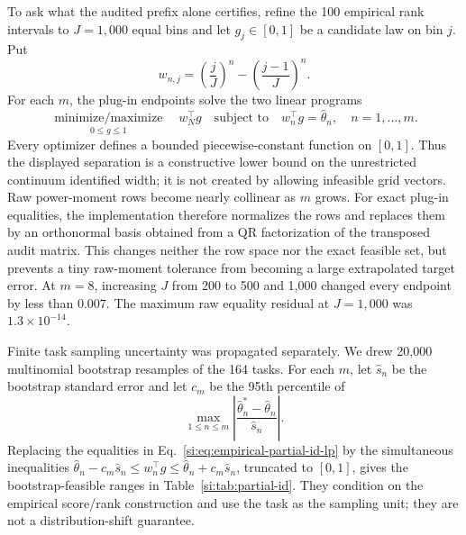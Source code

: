 To ask what the audited prefix alone certifies, refine the 100 empirical rank intervals to $J=1{,}000$ equal bins and let $g_j\in[0,1]$ be a candidate law on bin $j$. Put
\begin{equation}
w_{n,j}=\left(\frac jJ\right)^n-\left(\frac{j-1}J\right)^n.
\label{si:eq:bin-mass}
\end{equation}
For each $m$, the plug-in endpoints solve the two linear programs
\begin{equation}
\underset{0\le g\le1}{\operatorname{minimize/maximize}}\quad
w_N^\top g
\quad\text{subject to}\quad
w_n^\top g=\widehat\theta_n,\quad n=1,\ldots,m.
\label{si:eq:empirical-partial-id-lp}
\end{equation}
Every optimizer defines a bounded piecewise-constant function on $[0,1]$. Thus the displayed separation is a constructive lower bound on the unrestricted continuum identified width; it is not created by allowing infeasible grid vectors. Raw power-moment rows become nearly collinear as $m$ grows. For exact plug-in equalities, the implementation therefore normalizes the rows and replaces them by an orthonormal basis obtained from a QR factorization of the transposed audit matrix. This changes neither the row space nor the exact feasible set, but prevents a tiny raw-moment tolerance from becoming a large extrapolated target error. At $m=8$, increasing $J$ from 200 to 500 and 1,000 changed every endpoint by less than $0.007$. The maximum raw equality residual at $J=1{,}000$ was $1.3\times10^{-14}$.

Finite task sampling uncertainty was propagated separately. We drew 20,000 multinomial bootstrap resamples of the 164 tasks. For each $m$, let $\widehat s_n$ be the bootstrap standard error and let $c_m$ be the 95th percentile of
\begin{equation}
\max_{1\le n\le m}
\left|\frac{\widehat\theta_n^*-\widehat\theta_n}{\widehat s_n}\right|.
\label{si:eq:max-t-band}
\end{equation}
Replacing the equalities in Eq.~\ref{si:eq:empirical-partial-id-lp} by the simultaneous inequalities
$\widehat\theta_n-c_m\widehat s_n\le w_n^\top g\le\widehat\theta_n+c_m\widehat s_n$, truncated to $[0,1]$, gives the bootstrap-feasible ranges in Table~\ref{si:tab:partial-id}. They condition on the empirical score/rank construction and use the task as the sampling unit; they are not a distribution-shift guarantee.

